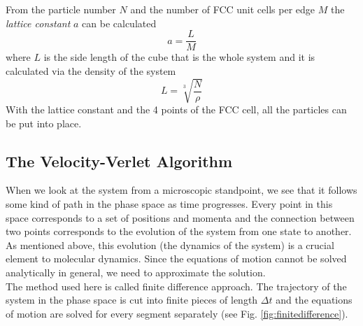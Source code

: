 \documentclass[12pt]{article}
\begin{document}
From the particle number $N$ and the number of FCC unit cells per edge $M$ the \textit{lattice constant} $a$ can be calculated
\begin{equation}
    a = \frac{L}{M}
\end{equation}
where $L$ is the side length of the cube that is the whole system and it is calculated via the density of the system
\begin{equation}
    L = \sqrt[3]{\frac{N}{\rho}}
\end{equation}
With the lattice constant and the 4 points of the FCC cell, all the particles can be put into place.

\subsection{The Velocity-Verlet Algorithm}
\label{section:verlet}
When we look at the system from a microscopic standpoint, we see that it follows some kind of path in the phase space as time progresses. Every
point in this space corresponds to a set of positions and momenta and the connection between two points corresponds to the evolution of the system
from one state to another. As mentioned above, this evolution (the dynamics of the system) is a crucial element to molecular dynamics. Since the
equations of motion cannot be solved analytically in general, we need to approximate the solution.\\
The method used here is called finite difference approach. The trajectory of the system in the phase space is cut into finite pieces of length $\Delta
t$ and the equations of motion are solved for every segment separately (see Fig. \ref{fig:finitedifference}).\\
\end{document}
